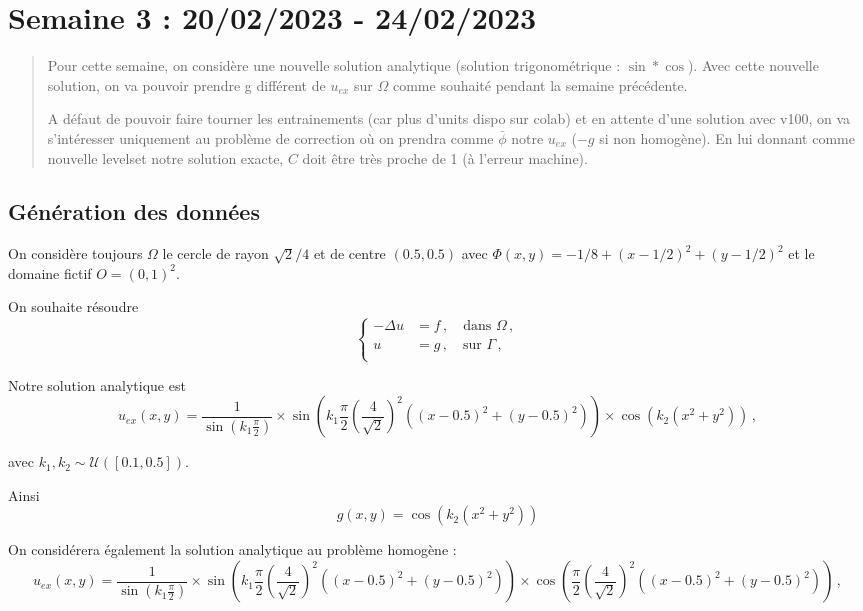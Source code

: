 \section{Semaine 3 : 20/02/2023 - 24/02/2023}
\graphicspath{{semaines/semaine_3/images/}}

\begin{abstract}
	Pour cette semaine, on considère une nouvelle solution analytique (solution trigonométrique : $\sin*\cos$). Avec cette nouvelle solution, on va pouvoir prendre g différent de $u_{ex}$ sur $\Omega$ comme souhaité pendant la semaine précédente. 
	
	A défaut de pouvoir faire tourner les entrainements (car plus d'units dispo sur colab) et en attente d'une solution avec v100, on va s'intéresser uniquement au problème de correction où on prendra comme $\bar{\phi}$ notre $u_{ex}$ ($-g$ si non homogène). En lui donnant comme nouvelle levelset notre solution exacte, $C$ doit être très proche de 1 (à l'erreur machine).  
\end{abstract}

\subsection{Génération des données}

On considère toujours $\Omega$ le cercle de rayon $\sqrt{2}/4$ et de centre $(0.5,0.5)$ avec $\Phi(x,y)=-1/8+(x-1/2)^2+(y-1/2)^2$ et le domaine fictif $O=(0,1)^2$.

On souhaite résoudre 
\begin{equation*}
	\begin{cases}
		-\Delta u &= f\,, \quad \text{dans $\Omega$}\,, \\
		u &= g\,, \quad \text{sur $\Gamma$}\,, \\
	\end{cases}
\end{equation*}

Notre solution analytique est
$$u_{ex}(x,y) = \frac{1}{\sin\left(k_1\frac{\pi}{2}\right)}\times\sin\left(k_1\frac{\pi}{2}\left(\frac{4}{\sqrt{2}}\right)^2\left((x-0.5)^2+(y-0.5)^2\right)\right)\times\cos(k_2(x^2+y^2))\,, $$ 

avec $k_1,k_2 \sim \mathcal{U}([0.1,0.5])$.

Ainsi 
$$g(x,y)=\cos(k_2(x^2+y^2))$$

On considérera également la solution analytique au problème homogène :
$$u_{ex}(x,y) = \frac{1}{\sin\left(k_1\frac{\pi}{2}\right)}\times\sin\left(k_1\frac{\pi}{2}\left(\frac{4}{\sqrt{2}}\right)^2\left((x-0.5)^2+(y-0.5)^2\right)\right)\times\cos\left(\frac{\pi}{2}\left(\frac{4}{\sqrt{2}}\right)^2\left((x-0.5)^2+(y-0.5)^2\right)\right)\,, $$ 

